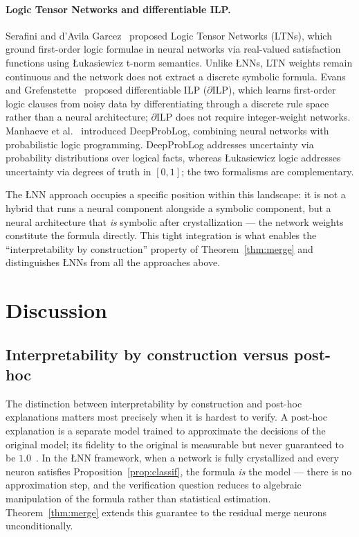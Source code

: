\documentclass[10pt,a4paper,twoside]{article}
\newcommand{\LNN}{\L{}NN}
\begin{document}
\paragraph{Logic Tensor Networks and differentiable ILP.}
Serafini and d'Avila Garcez~\cite{serafini2016} proposed Logic Tensor
Networks (LTNs), which ground first-order logic formulae in neural networks
via real-valued satisfaction functions using \L{}ukasiewicz t-norm semantics.
Unlike \LNN{}s, LTN weights remain continuous and the network does not
extract a discrete symbolic formula.
Evans and Grefenstette~\cite{evans2018} proposed differentiable
ILP ($\partial$ILP), which learns first-order logic clauses from noisy data
by differentiating through a discrete rule space rather than a neural
architecture; $\partial$ILP does not require integer-weight networks.
Manhaeve et al.~\cite{manhaeve2018} introduced DeepProbLog, combining neural
networks with probabilistic logic programming.
DeepProbLog addresses uncertainty via probability distributions over logical
facts, whereas \L{}ukasiewicz logic addresses uncertainty via degrees of truth
in $[0,1]$; the two formalisms are complementary.

The \LNN{} approach occupies a specific position within this landscape: it is
not a hybrid that runs a neural component alongside a symbolic component, but
a neural architecture that \emph{is} symbolic after crystallization --- the
network weights constitute the formula directly.
This tight integration is what enables the ``interpretability by construction''
property of Theorem~\ref{thm:merge} and distinguishes \LNN{}s from all the
approaches above.

\section{Discussion}
\label{sec:discussion}

\subsection{Interpretability by construction versus post-hoc}

The distinction between interpretability by construction and post-hoc
explanations matters most precisely when it is hardest to verify.
A post-hoc explanation is a separate model trained to approximate the
decisions of the original model; its fidelity to the original is measurable
but never guaranteed to be $1.0$~\cite{guidotti2018}.
In the \LNN{} framework, when a network is fully crystallized and every neuron
satisfies Proposition~\ref{prop:classif}, the formula \emph{is} the model ---
there is no approximation step, and the verification question reduces to
algebraic manipulation of the formula rather than statistical estimation.
Theorem~\ref{thm:merge} extends this guarantee to the residual merge neurons
unconditionally.
\end{document}
